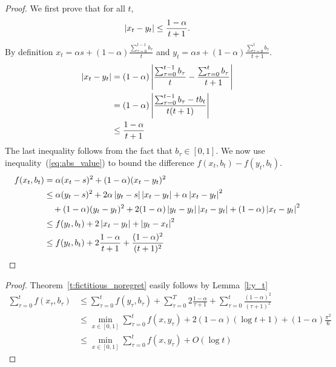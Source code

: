\begin{proof}
  We first prove that for all $t$,
  \begin{equation}\label{eq:abs_value}
    \left|x_t - y_t \right| \leq \frac{1-\alpha}{t+1}.
  \end{equation}
  By definition
  \(x_t = \alpha s + (1-\alpha)\frac{\sum_{\tau = 0}^{t-1} b_\tau}{t}\)
  and
  \( y_t = \alpha s + (1-\alpha)\frac{\sum_{\tau = 0}^t b_\tau}{t+1}\).
  \begin{align*}
    \left|x_t - y_t\right|
    &=
    (1-\alpha)\left|\frac{\sum_{\tau = 0}^{t-1}b_\tau}{t}
    - \frac{\sum_{\tau = 0}^t b_\tau}{t+1}\right|\\
    &=
    (1-\alpha)\left|\frac{\sum_{\tau = 0}^{t-1}b_\tau -tb_t}{t(t+1)}\right|\\
    &\leq
    \frac{1-\alpha}{t+1}
  \end{align*}
  The last inequality follows from the fact that $b_\tau \in [0,1]$.
  We now use inequality~(\ref{eq:abs_value}) to bound the difference
  \( f(x_t,b_t) - f(y_t,b_t) \).
  \begin{align*}
    f(x_t,b_t)
    &=
    \alpha(x_t - s)^2 + (1 - \alpha)(x_t - y_t)^2 \\
    &\leq
    \alpha(y_t - s)^2 + 2\alpha\left|y_t -
    s\right|\left|x_t - y_t\right| + \alpha \left|x_t - y_t\right|^2 \\
    &\quad + (1-\alpha)(y_t - y_t)^2 +
    2(1-\alpha)\left|y_t - y_t\right|\left|x_t-y_t\right| + (1 - \alpha)\left|x_t - y_t\right|^2\\
    &\leq
    f(y_t,b_t) + 2\left|x_t - y_t\right| + \left|y_t - x_t\right|^2\\
    &\leq
    f(y_t,b_t) + 2\frac{1-\alpha}{t+1} + \frac{(1-\alpha)^2}{(t+1)^2}
  \end{align*}
\end{proof}
\begin{proof}
 Theorem~\ref{t:fictitious_noregret} easily follows by Lemma~\ref{l:y_t}
\begin{align*}
  \sum_{\tau=0}^t f(x_\tau,b_\tau)
  &\leq
  \sum_{\tau=0}^t f(y_\tau,b_\tau) + \sum_{\tau=0}^T 2\frac{1-\alpha}{\tau+1} +
  \sum_{\tau=0}^t \frac{(1-\alpha)^2}{(\tau+1)^2}\\
  &\leq
  \min_{ x \in [0,1]} \sum_{\tau=0}^t f(x,y_\tau) +
  2(1-\alpha)(\log t + 1) + (1-\alpha)\frac{\pi^2}{6}\\
  &\leq
  \min_{ x \in [0,1]} \sum_{\tau=0}^t f(x,y_\tau) + O(\log t)
\end{align*}

\end{proof}
